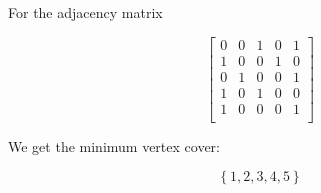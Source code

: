 \documentclass[12pt,listof=totoc,toc=sectionentrywithdots]{scrartcl}
\begin{document}
For the adjacency matrix

\[
    \begin{bmatrix}
        0 & 0 & 1 & 0 & 1 \\
        1 & 0 & 0 & 1 & 0 \\
        0 & 1 & 0 & 0 & 1 \\
        1 & 0 & 1 & 0 & 0 \\
        1 & 0 & 0 & 0 & 1 \\
    \end{bmatrix}
\]

We get the minimum vertex cover:

\begin{equation*}
    \left\{ 1, 2, 3, 4, 5 \right\}
\end{equation*}

% 
\end{document}
